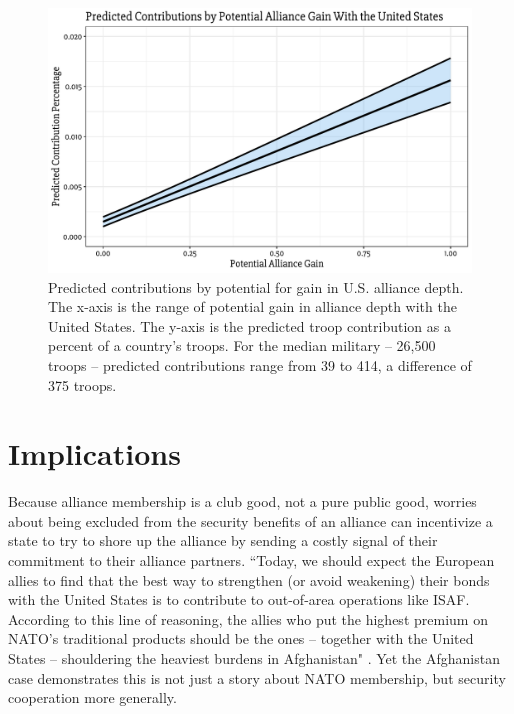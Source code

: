 \documentclass[12pt,letterpaper]{article}
\begin{document}
	\begin{figure}[ht]
		\centering
		\includegraphics[scale = 0.75]{figures/pred_contr.pdf}
		\caption{Predicted contributions by potential for gain in U.S. alliance depth. The x-axis is the range of potential gain in alliance depth with the United States. The y-axis is the predicted troop contribution as a percent of a country's troops. For the median military -- 26,500 troops -- predicted contributions range from 39 to 414, a difference of 375 troops.}
	\end{figure}
	

\section{Implications}
	Because alliance membership is a club good, not a pure public good, worries about being excluded from the security benefits of an alliance can incentivize a state to try to shore up the alliance by sending a costly signal of their commitment to their alliance partners. ``Today, we should expect the European allies to find that the best way to strengthen (or avoid weakening) their bonds with the United States is to contribute to out-of-area operations like ISAF. According to this line of reasoning, the allies who put the highest premium on NATO’s traditional products should be the ones – together with the United States – shouldering the heaviest burdens in Afghanistan" \citep[331]{ringsmose_natoburdensharingredux_2010}. Yet the Afghanistan case demonstrates this is not just a story about NATO membership, but security cooperation more generally.
\end{document}
